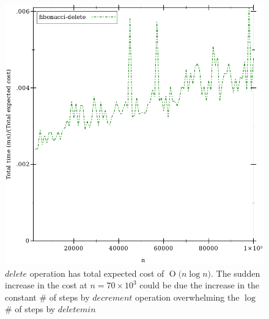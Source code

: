 \documentclass{llncs}
\newcommand{\BigO}[1]{\ensuremath{\operatorname{O}\bigl(#1\bigr)}}
\begin{document}
\begin{figure}
	\begin{center}
		\includegraphics[scale=0.7]{FIG/delete.pdf}
		\caption{$delete$ operation has total expected cost of \BigO{n \log n}. The sudden increase in the cost at $n=70\times10^3$ could be due the increase in the constant \# of steps by $decrement$ operation overwhelming the $\log$ \# of steps by $deletemin$ }
		\label{fig:fi_delete}
	\end{center}
\end{figure}
\end{document}
